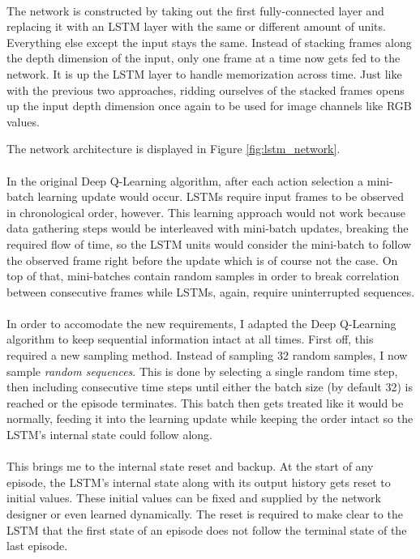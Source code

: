 \paragraph{}
The network is constructed by taking out
the first fully-connected layer
and replacing it with an LSTM layer
with the same or different amount of units.
Everything else except the input stays the same.
Instead of stacking frames along the depth dimension of the input,
only one frame at a time now gets fed to the network.
It is up the LSTM layer to handle memorization across time.
Just like with the previous two approaches,
ridding ourselves of the stacked frames opens up the input depth dimension
once again
to be used for image channels like RGB values.

The network architecture is displayed in Figure \ref{fig:lstm_network}.

\paragraph{}
In the original Deep Q-Learning algorithm,
after each action selection
a mini-batch learning update would occur.
LSTMs require input frames to be observed in chronological order, however.
This learning approach would not work
because data gathering steps would be interleaved with mini-batch updates,
breaking the required flow of time,
so the LSTM units
would consider the mini-batch to follow the observed frame right before the update
which is of course not the case.
On top of that, mini-batches contain random samples
in order to break correlation
between consecutive frames
while LSTMs, again, require uninterrupted sequences.

\paragraph{}
In order to accomodate the new requirements,
I adapted the Deep Q-Learning algorithm
to keep sequential information intact at all times.
First off,
this required a new sampling method.
Instead of sampling 32 random samples,
I now sample \textit{random sequences}.
This is done by selecting a single random time step,
then including consecutive time steps
until either the batch size (by default 32)
is reached or the episode terminates.
This batch then gets treated like it would be normally,
feeding it into the learning update while keeping the order intact
so the LSTM's internal state could follow along.

\paragraph{}
This brings me to the internal state reset and backup.
At the start of any episode,
the LSTM's internal state along with its output history
gets reset to initial values.
These initial values can be fixed and supplied
by the network designer
or even learned dynamically.
The reset is required to make clear to the LSTM
that the first state of an episode
does not follow the terminal state of the last episode.

